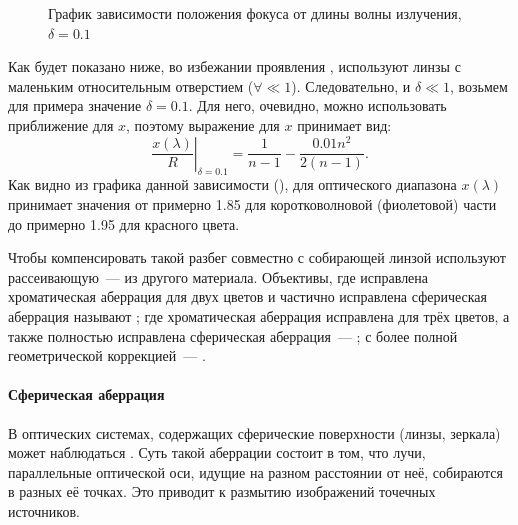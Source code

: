 \begin{figure}
    \centering
    \vspace{-1pc}
    \caption{График зависимости положения фокуса от длины волны излучения, $\delta = 0.1$}
    \label{pic:crown-dispersion-x}
\end{figure}
Как будет показано ниже, во избежании проявления , используют линзы с маленьким относительным отверстием ($\forall \ll 1$). Следовательно, и $\delta \ll 1$, возьмем для примера значение $\delta = 0.1$. Для него, очевидно, можно использовать приближение для $x$, поэтому выражение для $x$ принимает вид:
\begin{equation*}
    \left.\frac{x(\lambda)}{R}\right|_{\delta = 0.1} = \frac{1}{n-1} - \frac{0.01 n^2}{2(n-1)}.
\end{equation*}
Как видно из графика данной зависимости (), для оптического диапазона $x(\lambda)$ принимает значения от примерно 1.85 для коротковолновой (фиолетовой) части до примерно 1.95 для красного цвета.

Чтобы компенсировать такой разбег совместно с собирающей линзой используют рассеивающую~--- из другого материала. Объективы, где исправлена хроматическая аберрация для двух цветов и частично исправлена сферическая аберрация называют ; где хроматическая аберрация исправлена для трёх цветов, а также полностью исправлена сферическая аберрация~--- ; с более полной геометрической коррекцией~--- .

\paragraph{Сферическая аберрация}
В оптических системах, содержащих сферические поверхности (линзы, зеркала) может наблюдаться . Суть такой аберрации состоит в том, что лучи, параллельные оптической оси, идущие на разном расстоянии от неё, собираются в разных её точках. Это приводит к размытию изображений точечных источников.

